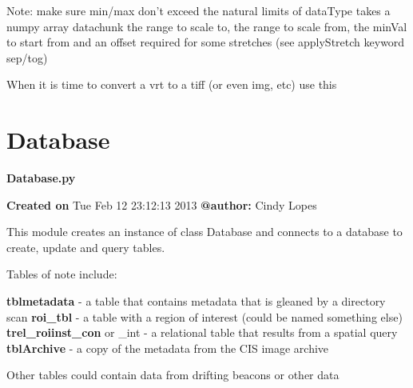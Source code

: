 \documentclass[letterpaper,10pt,english]{sphinxmanual}
\begin{document}
\begin{fulllineitems}
\begin{fulllineitems}
Note: make sure min/max don't exceed the natural limits of dataType
takes a numpy array datachunk the range to scale to, the range to scale
from, the minVal to start from and an offset required for some stretches
(see applyStretch keyword sep/tog)

\end{fulllineitems}


\begin{fulllineitems}
\label{code:Image.Image.vrt2RealImg}
When it is time to convert a vrt to a tiff (or even img, etc) use this

\end{fulllineitems}


\end{fulllineitems}



\section{Database}
\label{code:module-Database}\label{code:database}
\textbf{Database.py}

\textbf{Created on} Tue Feb 12 23:12:13 2013 \textbf{@author:} Cindy Lopes

This module creates an instance of class Database and connects to a database to
create, update and query tables.

Tables of note include:

\textbf{tblmetadata} - a table that contains metadata that is gleaned by a directory scan
\textbf{roi\_tbl} - a table with a region of interest (could be named something else)
\textbf{trel\_roiinst\_con} or \_int - a relational table that results from a spatial query
\textbf{tblArchive} - a copy of the metadata from the CIS image archive

Other tables could contain data from drifting beacons or other data
\end{document}
